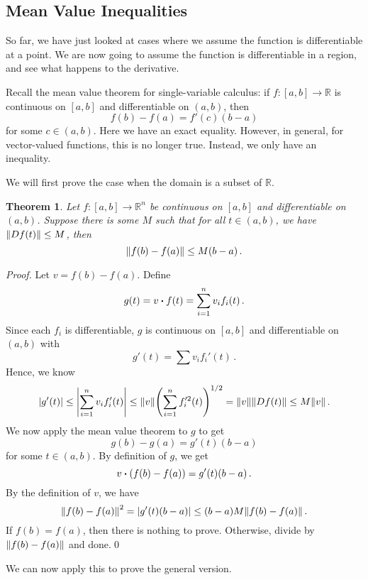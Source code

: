 \documentclass{article}
\theoremstyle{plain}\theoremheaderfont{\normalfont\itshape}\theorembodyfont{\rmfamily}\theoremseparator{.}\newtheorem*{rem}{Remark}\newtheorem*{ex}{Example}\newtheorem*{proof}{Proof}\newtheorem*{altp}{Alternative proof}
\theoremstyle{plain}\theoremheaderfont{\normalfont\bfseries}\theorembodyfont{\rmfamily}\theoremseparator{.}\newtheorem{thm}{Theorem}[section]\newtheorem{lem}[thm]{Lemma}\newtheorem{prop}[thm]{Proposition}\newtheorem*{cor}{Corollary}\newtheorem{defn}[thm]{Definition}\newtheorem{clm}[thm]{Claim}\newtheorem{clminproof}{Claim}
\theoremstyle{break}\theoremheaderfont{\normalfont\itshape}\theorembodyfont{\rmfamily}\theoremseparator{.\medskip}\newtheorem*{proofskip}{Proof}\newtheorem*{exs}{Examples}\newtheorem*{rems}{Remarks}
\theoremstyle{break}\theoremheaderfont{\normalfont\bfseries}\theorembodyfont{\rmfamily}\theoremseparator{.\medskip}\newtheorem{lemskip}[thm]{Lemma}\newtheorem{defnskip}[thm]{Definition}\newtheorem{propskip}[thm]{Proposition}\newtheorem{thmskip}[thm]{Theorem}
\newcommand{\qed}{\hfill\ensuremath{\Box}}
\begin{document}
    \subsection{Mean Value Inequalities}
    So far, we have just looked at cases where we assume the function is differentiable at a point. We are now going to assume the function is differentiable in a region, and see what happens to the derivative.

    Recall the mean value theorem for single-variable calculus: if \(f:[a,b]\to\mathbb{R}\) is continuous on \([a,b]\) and differentiable on \((a,b)\), then
    \[f(b)-f(a)=f'(c)(b-a)\]
    for some \(c\in(a,b)\). Here we have an exact equality. However, in general, for vector-valued functions, this is no longer true. Instead, we only have an inequality.

    We will first prove the case when the domain is a subset of \(\mathbb{R}\).
    \begin{thm}
        Let \(f:[a,b]\to\mathbb{R}^n\) be continuous on \([a,b]\) and differentiable on \((a,b)\). Suppose there is some \(M\) such that for all \(t\in(a,b)\), we have \(\norm{Df(t)}\le M\), then
        \[\norm{f(b)-f(a)}\le M(b-a)\,.\]
    \end{thm}
    \begin{proof}
        Let \(v=f(b)-f(a)\). Define
        \[g(t)=v\vdot f(t)=\sum_{i=1}^{n}v_if_i(t)\,.\]
        Since each \(f_i\) is differentiable, \(g\) is continuous on \([a,b]\) and differentiable on \((a,b)\) with
        \[g'(t)=\sum v_if_i'(t)\,.\]
        Hence, we know
        \[\abs{g'(t)}\le\abs{\sum_{i=1}^{n}v_if_i'(t)}\le\norm{v}\qty(\sum_{i=1}^{n}f_i'^2(t))^{1/2}=\norm{v}\norm{Df(t)}\le M\norm{v}\,.\]
        We now apply the mean value theorem to \(g\) to get
        \[g(b)-g(a)=g'(t)(b-a)\]
        for some \(t\in(a,b)\). By definition of \(g\), we get
        \[v\vdot(f(b)-f(a))=g'(t)(b-a)\,.\]
        By the definition of \(v\), we have
        \[\norm{f(b)-f(a)}^2=\abs{g'(t)(b-a)}\le(b-a)M\norm{f(b)-f(a)}\,.\]
        If \(f(b)=f(a)\), then there is nothing to prove. Otherwise, divide by \(\norm{f(b)-f(a)}\) and done.\qed
    \end{proof}

    We can now apply this to prove the general version.
\end{document}
